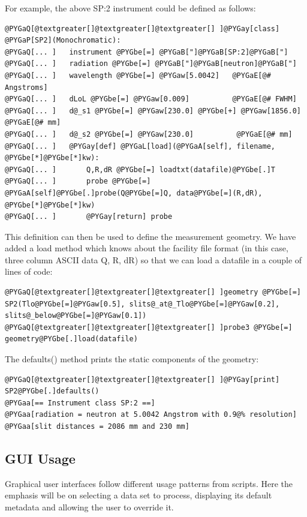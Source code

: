 \documentclass[letterpaper,10pt,english]{sphinxmanual}
\begin{document}
For example, the above SP:2 instrument could be defined as follows:

\begin{Verbatim}[commandchars=@\[\]]
@PYGaQ[@textgreater[]@textgreater[]@textgreater[] ]@PYGay[class] @PYGaP[SP2](Monochromatic):
@PYGaQ[... ]   instrument @PYGbe[=] @PYGaB["]@PYGaB[SP:2]@PYGaB["]
@PYGaQ[... ]   radiation @PYGbe[=] @PYGaB["]@PYGaB[neutron]@PYGaB["]
@PYGaQ[... ]   wavelength @PYGbe[=] @PYGaw[5.0042]   @PYGaE[@# Angstroms]
@PYGaQ[... ]   dLoL @PYGbe[=] @PYGaw[0.009]          @PYGaE[@# FWHM]
@PYGaQ[... ]   d@_s1 @PYGbe[=] @PYGaw[230.0] @PYGbe[+] @PYGaw[1856.0] @PYGaE[@# mm]
@PYGaQ[... ]   d@_s2 @PYGbe[=] @PYGaw[230.0]          @PYGaE[@# mm]
@PYGaQ[... ]   @PYGay[def] @PYGaL[load](@PYGaA[self], filename, @PYGbe[*]@PYGbe[*]kw):
@PYGaQ[... ]       Q,R,dR @PYGbe[=] loadtxt(datafile)@PYGbe[.]T
@PYGaQ[... ]       probe @PYGbe[=] @PYGaA[self]@PYGbe[.]probe(Q@PYGbe[=]Q, data@PYGbe[=](R,dR), @PYGbe[*]@PYGbe[*]kw)
@PYGaQ[... ]       @PYGay[return] probe
\end{Verbatim}

This definition can then be used to define the measurement geometry.  We
have added a load method which knows about the facility file format (in
this case, three column ASCII data Q, R, dR) so that we can load a datafile
in a couple of lines of code:

\begin{Verbatim}[commandchars=@\[\]]
@PYGaQ[@textgreater[]@textgreater[]@textgreater[] ]geometry @PYGbe[=] SP2(Tlo@PYGbe[=]@PYGaw[0.5], slits@_at@_Tlo@PYGbe[=]@PYGaw[0.2], slits@_below@PYGbe[=]@PYGaw[0.1])
@PYGaQ[@textgreater[]@textgreater[]@textgreater[] ]probe3 @PYGbe[=] geometry@PYGbe[.]load(datafile)
\end{Verbatim}

The defaults() method prints the static components of the geometry:

\begin{Verbatim}[commandchars=@\[\]]
@PYGaQ[@textgreater[]@textgreater[]@textgreater[] ]@PYGay[print] SP2@PYGbe[.]defaults()
@PYGaa[== Instrument class SP:2 ==]
@PYGaa[radiation = neutron at 5.0042 Angstrom with 0.9@% resolution]
@PYGaa[slit distances = 2086 mm and 230 mm]
\end{Verbatim}


\subsection{GUI Usage}
\label{api/instrument:gui-usage}
Graphical user interfaces follow different usage patterns from scripts.
Here the emphasis will be on selecting a data set to process, displaying
its default metadata and allowing the user to override it.
\end{document}
